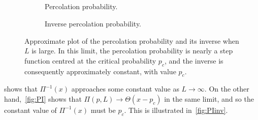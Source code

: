 \documentclass[11pt,british,a4paper]{report}
\begin{document}
\subsection{}
\begin{figure}[H]
    \centering
    \begin{subfigure}[b]{0.45\textwidth}
        \caption{Percolation probability.}%
    \end{subfigure}\quad
    \begin{subfigure}[b]{0.45\textwidth}
        \caption{Inverse percolation probability.}%
    \end{subfigure}
    \caption{Approximate plot of the percolation probability and its inverse when \(L\) is large. In this limit, the percolation probability is nearly a step function centred at the critical probability \(p_c\), and the inverse is consequently approximately constant, with value \(p_c\).}%
    \label{fig:PIinv}
\end{figure}
 shows that \(\Pi^{-1}(x)\) approaches some constant value as \(L\to\infty\). On the other hand,~\vref{fig:PI} shows that \(\Pi(p,L)\to \Theta(x-p_c)\) in the same limit, and so the constant value of \(\Pi^{-1}(x)\) must be \(p_c\). This is illustrated in~\vref{fig:PIinv}.
\end{document}
